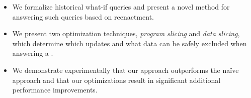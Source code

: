 \begin{itemize}[noitemsep,topsep=0pt,parsep=0pt,partopsep=0pt,leftmargin=*]
\item
We formalize historical what-if queries and present a novel method for answering such queries based on reenactment.


\item We present two optimization techniques, \emph{program slicing} and \emph{data slicing}, which determine which updates and what data can be safely excluded when answering a \abbrHW.


\item We demonstrate experimentally that our approach outperforms the naïve approach and that our optimizations result in significant additional performance improvements. %

\end{itemize}

